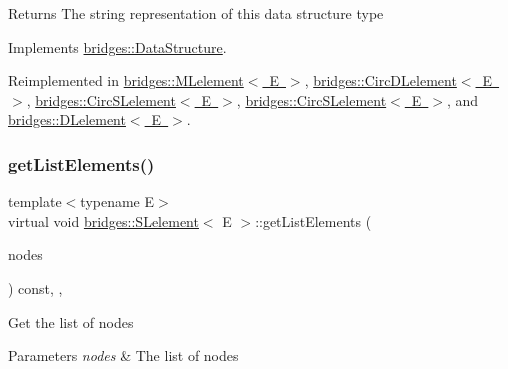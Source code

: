 \begin{DoxyReturn}{Returns}
The string representation of this data structure type 
\end{DoxyReturn}


Implements \mbox{\hyperlink{classbridges_1_1_data_structure_a957a63b106e340bc753620c650632bdc}{bridges\+::\+Data\+Structure}}.



Reimplemented in \mbox{\hyperlink{classbridges_1_1_m_lelement_af6e8a50c38e6481ce2c569d0174c564e}{bridges\+::\+M\+Lelement$<$ E $>$}}, \mbox{\hyperlink{classbridges_1_1_circ_d_lelement_a0e199fe681755df694807261ce2460c2}{bridges\+::\+Circ\+D\+Lelement$<$ E $>$}}, \mbox{\hyperlink{classbridges_1_1_circ_s_lelement_a4b27c205af46162371e3ffe05cbbe3d5}{bridges\+::\+Circ\+S\+Lelement$<$ E $>$}}, \mbox{\hyperlink{classbridges_1_1_circ_s_lelement_a4b27c205af46162371e3ffe05cbbe3d5}{bridges\+::\+Circ\+S\+Lelement$<$ E $>$}}, and \mbox{\hyperlink{classbridges_1_1_d_lelement_a109be7aba8bd3d0450859938b5d3144c}{bridges\+::\+D\+Lelement$<$ E $>$}}.

\mbox{\label{classbridges_1_1_s_lelement_a954395391ee5cfe3a64b9f7aca4b3b21}} 
\subsubsection{\texorpdfstring{get\+List\+Elements()}{getListElements()}}
{\footnotesize\ttfamily template$<$typename E$>$ \\
virtual void \mbox{\hyperlink{classbridges_1_1_s_lelement}{bridges\+::\+S\+Lelement}}$<$ E $>$\+::get\+List\+Elements (\begin{DoxyParamCaption}\item[{vector$<$ const \mbox{\hyperlink{classbridges_1_1_s_lelement}{S\+Lelement}}$<$ E $>$ $\ast$$>$ \&}]{nodes }\end{DoxyParamCaption}) const\hspace{0.3cm}{\ttfamily [inline]}, {\ttfamily [protected]}, {\ttfamily [virtual]}}

Get the list of nodes


\begin{DoxyParams}{Parameters}
{\em nodes} & The list of nodes \\
\hline
\end{DoxyParams}
\mbox{\label{classbridges_1_1_s_lelement_a5bd74108a9aa49339378bf62cdbb19ca}} 
